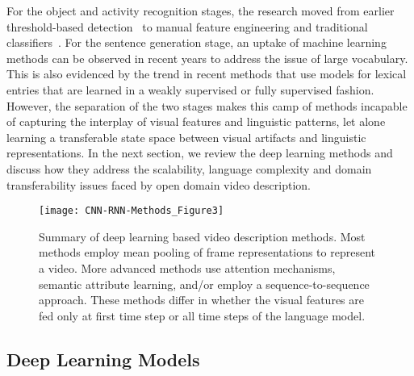 \documentclass[10pt,journal,compsoc]{IEEEtran}
\begin{document}
For the object and activity recognition stages, the research moved from earlier threshold-based detection~\cite{kojima2002natural} to manual feature engineering and traditional classifiers~\cite{krishnamoorthy2013generating,das2013thousand,guadarrama2013youtube2text, thomason2014integrating}. For the sentence generation stage, an uptake of machine learning methods can be observed in recent years to address the issue of large vocabulary. This is also evidenced by the trend in recent methods that use models for lexical entries that are learned 
in a weakly supervised \cite{rohrbach2014coherent,rohrbach2013translating,xu2015jointly,yu2015learning} or fully supervised \cite{corso2015gbs,guadarrama2013youtube2text,krishnamoorthy2013generating,sun2014semantic} fashion. However, the separation of the two stages makes this camp of methods incapable of capturing the interplay of visual features and linguistic patterns, let alone learning a transferable state space between visual artifacts and linguistic representations. In the next section, we review the deep learning methods and discuss how they address the scalability, language complexity and domain transferability issues faced by open domain video description.

\begin{figure*}[htbp] 
   \centering
   \texttt{[image: CNN-RNN-Methods\_Figure3]} 
   \caption{Summary of deep learning based video description methods. Most methods employ mean pooling of frame representations to represent a video. More advanced methods use attention mechanisms, semantic attribute learning, and/or employ a sequence-to-sequence approach. These methods differ in whether the visual features are fed only at first time step or all time steps of the language model.}
\label{fig:methodssummary}
\vspace{-3mm}
\end{figure*}

\subsection{Deep Learning Models}       %
\end{document}
